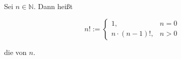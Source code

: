 Sei $n \in \mathbb{N}$. Dann heißt 

$$
n! := \begin{cases}
1, & n=0 \\
n \cdot (n-1)!, & n>0
\end{cases}
$$

die  von $n$.